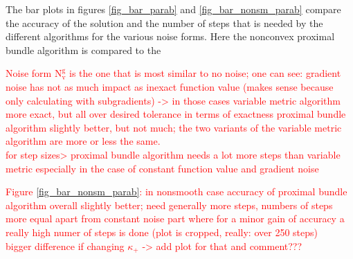 The bar plots in figures \ref{fig_bar_parab} and \ref{fig_bar_nonsm_parab} compare the accuracy of the solution and the number of steps that is needed by the different algorithms for the various noise forms. Here the nonconvex proximal bundle algorithm is compared to the 


\textcolor{red}{Noise form \(\text{N}_{\text{v}}^{\text{g}}\) is the one that is most similar to no noise; one can see: gradient noise has not as much impact as inexact function value (makes sense because only calculating with subgradients) -> in those cases variable metric algorithm more exact, but all over desired tolerance
in terms of exactness proximal bundle algorithm slightly better, but not much; the two variants of the variable metric algorithm are more or less the same.\\
for step sizes> proximal bundle algorithm needs a lot more steps than variable metric especially in the case of constant function value and gradient noise}

\textcolor{red}{Figure \ref{fig_bar_nonsm_parab}:  in nonsmooth case accuracy of proximal bundle algorithm overall slightly better; need generally more steps, numbers of steps more equal apart from constant noise part where for a minor gain of accuracy a really high numer of steps is done (plot is cropped, really: over 250 steps)\\
bigger difference if changing \(\kappa_+\) -> add plot for that and comment???}

